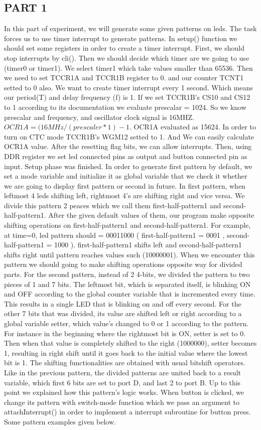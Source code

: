 \documentclass[pdftex,12pt,a4paper]{article}
\begin{document}
\subsection{PART 1}
In this part of experiment, we will generate some given patterns on leds. The task forces us to use timer interrupt to generate patterns. In setup() function we should set some registers in order to create a timer interrupt. First, we should stop interrupts by cli(). Then we should decide which timer are we going to use (timer0 or timer1). We select timer1 which take values smaller than 65536. Then we need to set TCCR1A and TCCR1B register to 0. and our counter TCNT1 setted to 0 also. We want to create timer interrupt every 1 second. Which means our period(T) and delay frequency (f) is 1. If we set TCCR1B's CS10 and CS12 to 1 according to its documentation we evaluate prescalar = 1024. So we know prescalar and frequency, and oscillator clock signal is 16MHZ. $OCR1A = (16MHz / (prescaler*1) -1$. OCR1A evaluated as 15624. In order to turn on CTC mode  TCCR1B's WGM12 setted to 1. And We can easily calculate OCR1A value.
After the resetting flag bits, we can allow interrupts. Then, using DDR register we set led connected pins as output and button connected pin as input. Setup phase was finished. In order to generate first pattern by default, we set a mode variable and initialize it as global variable that we check it whether we are going to display first pattern or second in future. In first pattern, when leftmost 4 leds shifting left, rightmost 4's are shifting right and vice versa. We divide this pattern 2 peaces which we call them first-half-pattern1 and second-half-pattern1. After the given default values of them, our program make opposite shifting operations on first-half-pattern1 and second-half-pattern1. For example, at time=0, led pattern should = 00011000 ( first-half-pattern1 = 0001 , second-half-pattern1 = 1000 ). first-half-pattern1 shifts left and second-half-pattern1 shifts right until pattern reaches values such (10000001). When we encounter this pattern we should going to make shifting operations opposite way for divided parts.  For the second pattern, instead of 2 4-bits, we divided the pattern to two pieces of 1 and 7 bits. The leftmost bit, which is separated itself, is blinking ON and OFF according to the global counter variable that is incremented every time. This results in a single LED that is blinking on and off every second. For the other 7 bits that was divided, its value are shifted left or right according to a global variable setter, which value's changed to 0 or 1 according to the pattern. For instance in the beginning where the rightmost bit is ON, setter is set to 0. Then when that value is completely shifted to the right (1000000), setter becomes 1, resulting in right shift until it goes back to the initial value where the lowest bit is 1. The shifting functionalities are obtained with usual bitshift operators. Like in the previous pattern, the divided patterns are united back to a result variable, which first 6 bits are set to port D, and last 2 to port B. Up to this point we explained how this pattern's logic works. When button is clicked, we change its pattern with switch-mode function which we pass an argument to attachInterrupt() in order to implement a interrupt subroutine for button press. Some pattern examples given below.
\end{document}

